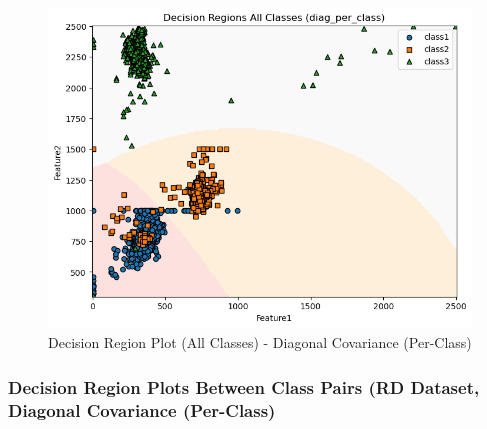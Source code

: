 \begin{figure}[H]
    \centering
    \includegraphics[width=0.85\linewidth]{images/RD_Group04_images/03_diag_per_class/05_decision_region_all.png}
    \caption{Decision Region Plot (All Classes) - Diagonal Covariance (Per-Class)}
\end{figure}

\subsubsection{Decision Region Plots Between Class Pairs (RD Dataset, Diagonal Covariance (Per-Class)}

